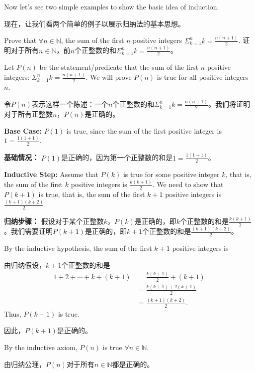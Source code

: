 \documentclass{Math_Note}
\begin{document}
Now let's see two simple examples to show the basic idea of induction.

现在，让我们看两个简单的例子以展示归纳法的基本思想。

\begin{prb}
    Prove that $\forall n \in \mathbb{N}$, the sum of the first $n$ positive integers $\Sigma_{k=1}^{n} k=\frac{n(n+1)}{2}$.
    证明对于所有$n \in \mathbb{N}$，前$n$个正整数的和$\Sigma_{k=1}^{n} k=\frac{n(n+1)}{2}$。
\end{prb}

\begin{sol}
    Let $P(n)$ be the statement/predicate that the sum of the first $n$ positive integers: $\Sigma_{k=1}^{n} k=\frac{n(n+1)}{2}$. We will prove $P(n)$ is true for all positive integers $n$.

    令$P(n)$表示这样一个陈述：一个$n$个正整数的和$\Sigma_{k=1}^{n} k=\frac{n(n+1)}{2}$。我们将证明对于所有正整数$n$，$P(n)$是正确的。

    \textbf{Base Case:} $P(1)$ is true, since the sum of the first positive integer is $1 = \frac{1(1+1)}{2}$.
    
    \textbf{基础情况：} $P(1)$是正确的，因为第一个正整数的和是$1 = \frac{1(1+1)}{2}$。

    \textbf{Inductive Step:} Assume that $P(k)$ is true for some positive integer $k$, that is, the sum of the first $k$ positive integers is $\frac{k(k+1)}{2}$. We need to show that $P(k+1)$ is true, that is, the sum of the first $k+1$ positive integers is $\frac{(k+1)(k+2)}{2}$.

    \textbf{归纳步骤：} 假设对于某个正整数$k$，$P(k)$是正确的，即$k$个正整数的和是$\frac{k(k+1)}{2}$。我们需要证明$P(k+1)$是正确的，即$k+1$个正整数的和是$\frac{(k+1)(k+2)}{2}$。

    By the inductive hypothesis, the sum of the first $k+1$ positive integers is 

    由归纳假设，$k+1$个正整数的和是
    \begin{align*}
        1+2+\cdots+k+(k+1) &= \frac{k(k+1)}{2} + (k+1)\\
        &= \frac{k(k+1)+2(k+1)}{2}\\
        &= \frac{(k+1)(k+2)}{2}.
    \end{align*}
    Thus, $P(k+1)$ is true.

    因此，$P(k+1)$是正确的。

    By the inductive axiom, $P(n)$ is true $\forall n \in \mathbb{N}$.

    由归纳公理，$P(n)$对于所有$n \in \mathbb{N}$都是正确的。
\end{sol}
\end{document}
